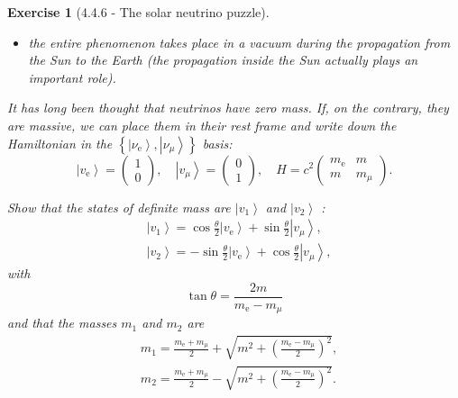 \documentclass[12pt]{article}
\def\bea{\begin{eqnarray*}}
\newtheorem{exercise}{Exercise}
\begin{document}
\begin{exercise}[4.4.6 - The solar neutrino puzzle]
\begin{itemize}
			\item the entire phenomenon takes place in a vacuum during the propagation from the Sun to the Earth (the propagation inside the Sun actually plays an important role).
		\end{itemize}
		It has long been thought that neutrinos have zero mass. If, on the contrary, they are massive, we can place them in their rest frame and write down the Hamiltonian in the $\left\{\left|\nu_{\mathrm{e}}\right\rangle,\left|\nu_{\mu}\right\rangle\right\}$ basis:
		$$
		\left|v_{\mathrm{e}}\right\rangle=\left(\begin{array}{l}
			1 \\
			0
		\end{array}\right), \quad\left|v_{\mu}\right\rangle=\left(\begin{array}{l}
			0 \\
			1
		\end{array}\right), \quad H=c^{2}\left(\begin{array}{cc}
			m_{\mathrm{e}} & m \\
			m & m_{\mu}
		\end{array}\right) .
		$$
		\begin{exercises}
			\item Show that the states of definite mass are $\left|v_{1}\right\rangle$ and $\left|v_{2}\right\rangle$ :
			$$
			\begin{aligned}
				& \left|v_{1}\right\rangle=\cos \frac{\theta}{2}\left|v_{\mathrm{e}}\right\rangle+\sin \frac{\theta}{2}\left|v_{\mu}\right\rangle, \\
				& \left|v_{2}\right\rangle=-\sin \frac{\theta}{2}\left|v_{\mathrm{e}}\right\rangle+\cos \frac{\theta}{2}\left|v_{\mu}\right\rangle,
			\end{aligned}
			$$
			with
			$$
			\tan \theta=\frac{2 m}{m_{\mathrm{e}}-m_{\mu}}
			$$
			and that the masses $m_{1}$ and $m_{2}$ are
			$$
			\begin{aligned}
				& m_{1}=\frac{m_{\mathrm{e}}+m_{\mu}}{2}+\sqrt{m^{2}+\left(\frac{m_{\mathrm{e}}-m_{\mu}}{2}\right)^{2}}, \\
				& m_{2}=\frac{m_{\mathrm{e}}+m_{\mu}}{2}-\sqrt{m^{2}+\left(\frac{m_{\mathrm{e}}-m_{\mu}}{2}\right)^{2}} .
			\end{aligned}
			$$
\end{exercises}
\end{exercise}
\end{document}

